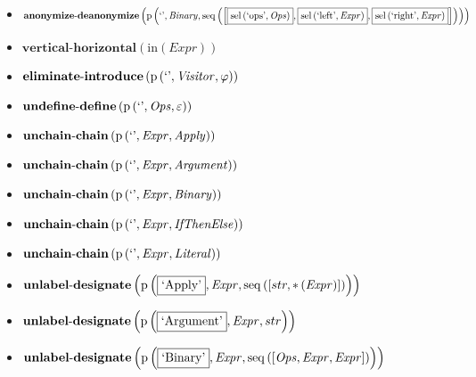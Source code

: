 {\begin{itemize}
\item $\mathbf{anonymize\text{-}deanonymize}\\\left(\mathrm{p}\left(\text{`'},\mathit{Binary},\mathrm{seq}\left(\left[\fbox{$\mathrm{sel}\left(\text{`ops'},\mathit{Ops}\right)$}, \fbox{$\mathrm{sel}\left(\text{`left'},\mathit{Expr}\right)$}, \fbox{$\mathrm{sel}\left(\text{`right'},\mathit{Expr}\right)$}\right]\right)\right)\right)$
\item $\mathbf{vertical\text{-}horizontal}\left(\mathrm{in}(Expr)\right)$
\item $\mathbf{eliminate\text{-}introduce}\\\left(\mathrm{p}\left(\text{`'},\mathit{Visitor},\varphi\right)\right)$
\item $\mathbf{undefine\text{-}define}\\\left(\mathrm{p}\left(\text{`'},\mathit{Ops},\varepsilon\right)\right)$
\item $\mathbf{unchain\text{-}chain}\\\left(\mathrm{p}\left(\text{`'},\mathit{Expr},\mathit{Apply}\right)\right)$
\item $\mathbf{unchain\text{-}chain}\\\left(\mathrm{p}\left(\text{`'},\mathit{Expr},\mathit{Argument}\right)\right)$
\item $\mathbf{unchain\text{-}chain}\\\left(\mathrm{p}\left(\text{`'},\mathit{Expr},\mathit{Binary}\right)\right)$
\item $\mathbf{unchain\text{-}chain}\\\left(\mathrm{p}\left(\text{`'},\mathit{Expr},\mathit{IfThenElse}\right)\right)$
\item $\mathbf{unchain\text{-}chain}\\\left(\mathrm{p}\left(\text{`'},\mathit{Expr},\mathit{Literal}\right)\right)$
\item $\mathbf{unlabel\text{-}designate}\\\left(\mathrm{p}\left(\fbox{\text{`Apply'}},\mathit{Expr},\mathrm{seq}\left(\left[str, {*}\left(\mathit{Expr}\right)\right]\right)\right)\right)$
\item $\mathbf{unlabel\text{-}designate}\\\left(\mathrm{p}\left(\fbox{\text{`Argument'}},\mathit{Expr},str\right)\right)$
\item $\mathbf{unlabel\text{-}designate}\\\left(\mathrm{p}\left(\fbox{\text{`Binary'}},\mathit{Expr},\mathrm{seq}\left(\left[\mathit{Ops}, \mathit{Expr}, \mathit{Expr}\right]\right)\right)\right)$

\end{itemize}}

